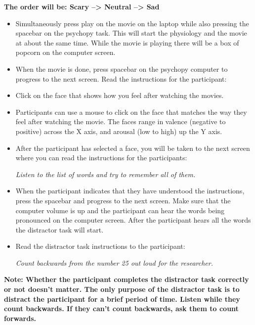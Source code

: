 \documentclass[
]{book}
\begin{document}
\textbf{The order will be: Scary --\textgreater{} Neutral --\textgreater{} Sad}

\begin{itemize}
\item
  Simultaneously press play on the movie on the laptop while also pressing the spacebar on the psychopy task. This will start the physiology and the movie at about the same time. While the movie is playing there will be a box of popcorn on the computer screen.
\item
  When the movie is done, press spacebar on the psychopy computer to progress to the next screen. Read the instructions for the participant:
\item
  Click on the face that shows how you feel after watching the movies.
\item
  Participants can use a mouse to click on the face that matches the way they feel after watching the movie. The faces range in valence (negative to positive) across the X axis, and arousal (low to high) up the Y axis.
\item
  After the participant has selected a face, you will be taken to the next screen where you can read the instructions for the participants:

  \emph{Listen to the list of words and try to remember all of them.}
\item
  When the participant indicates that they have understood the instructions, press the spacebar and progress to the next screen. Make sure that the computer volume is up and the participant can hear the words being pronounced on the computer screen. After the participant hears all the words the distractor task will start.
\item
  Read the distractor task instructions to the participant:

  \emph{Count backwards from the number 25 out loud for the researcher.}
\end{itemize}

\textbf{Note: Whether the participant completes the distractor task correctly or not doesn't matter. The only purpose of the distractor task is to distract the participant for a brief period of time. Listen while they count backwards. If they can't count backwards, ask them to count forwards.}
\end{document}
